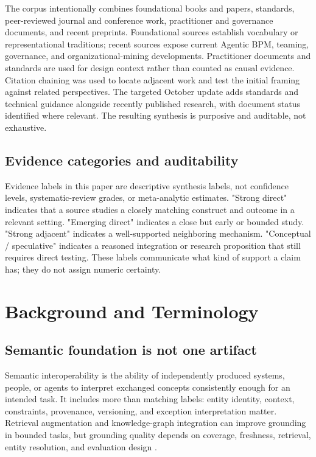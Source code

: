 \documentclass[11pt,letterpaper]{article}
\newcommand{\parencite}[1]{\citep{#1}}
\begin{document}
The corpus intentionally combines foundational books and papers, standards, peer-reviewed journal and conference work, practitioner and governance documents, and recent preprints. Foundational sources establish vocabulary or representational traditions; recent sources expose current Agentic BPM, teaming, governance, and organizational-mining developments. Practitioner documents and standards are used for design context rather than counted as causal evidence. Citation chaining was used to locate adjacent work and test the initial framing against related perspectives. The targeted October update adds standards and technical guidance alongside recently published research, with document status identified where relevant. The resulting synthesis is purposive and auditable, not exhaustive.

\subsection{Evidence categories and auditability}
Evidence labels in this paper are descriptive synthesis labels, not confidence levels, systematic-review grades, or meta-analytic estimates. "Strong direct" indicates that a source studies a closely matching construct and outcome in a relevant setting. "Emerging direct" indicates a close but early or bounded study. "Strong adjacent" indicates a well-supported neighboring mechanism. "Conceptual / speculative" indicates a reasoned integration or research proposition that still requires direct testing. These labels communicate what kind of support a claim has; they do not assign numeric certainty.

\section{Background and Terminology}
\subsection{Semantic foundation is not one artifact}
Semantic interoperability is the ability of independently produced systems, people, or agents to interpret exchanged concepts consistently enough for an intended task. It includes more than matching labels: entity identity, context, constraints, provenance, versioning, and exception interpretation matter. Retrieval augmentation and knowledge-graph integration can improve grounding in bounded tasks, but grounding quality depends on coverage, freshness, retrieval, entity resolution, and evaluation design \parencite{lewis2020retrieval,pan2024unifying}.
\end{document}
